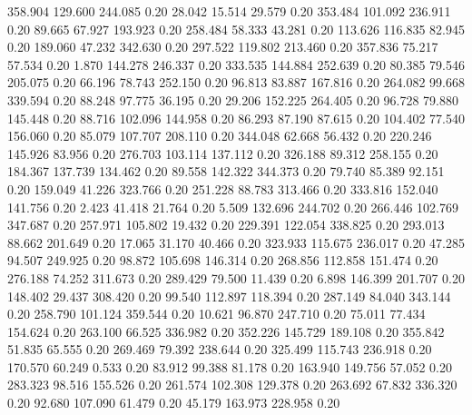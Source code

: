  358.904  129.600  244.085         0.20
  28.042   15.514   29.579         0.20
 353.484  101.092  236.911         0.20
  89.665   67.927  193.923         0.20
 258.484   58.333   43.281         0.20
 113.626  116.835   82.945         0.20
 189.060   47.232  342.630         0.20
 297.522  119.802  213.460         0.20
 357.836   75.217   57.534         0.20
   1.870  144.278  246.337         0.20
 333.535  144.884  252.639         0.20
  80.385   79.546  205.075         0.20
  66.196   78.743  252.150         0.20
  96.813   83.887  167.816         0.20
 264.082   99.668  339.594         0.20
  88.248   97.775   36.195         0.20
  29.206  152.225  264.405         0.20
  96.728   79.880  145.448         0.20
  88.716  102.096  144.958         0.20
  86.293   87.190   87.615         0.20
 104.402   77.540  156.060         0.20
  85.079  107.707  208.110         0.20
 344.048   62.668   56.432         0.20
 220.246  145.926   83.956         0.20
 276.703  103.114  137.112         0.20
 326.188   89.312  258.155         0.20
 184.367  137.739  134.462         0.20
  89.558  142.322  344.373         0.20
  79.740   85.389   92.151         0.20
 159.049   41.226  323.766         0.20
 251.228   88.783  313.466         0.20
 333.816  152.040  141.756         0.20
   2.423   41.418   21.764         0.20
   5.509  132.696  244.702         0.20
 266.446  102.769  347.687         0.20
 257.971  105.802   19.432         0.20
 229.391  122.054  338.825         0.20
 293.013   88.662  201.649         0.20
  17.065   31.170   40.466         0.20
 323.933  115.675  236.017         0.20
  47.285   94.507  249.925         0.20
  98.872  105.698  146.314         0.20
 268.856  112.858  151.474         0.20
 276.188   74.252  311.673         0.20
 289.429   79.500   11.439         0.20
   6.898  146.399  201.707         0.20
 148.402   29.437  308.420         0.20
  99.540  112.897  118.394         0.20
 287.149   84.040  343.144         0.20
 258.790  101.124  359.544         0.20
  10.621   96.870  247.710         0.20
  75.011   77.434  154.624         0.20
 263.100   66.525  336.982         0.20
 352.226  145.729  189.108         0.20
 355.842   51.835   65.555         0.20
 269.469   79.392  238.644         0.20
 325.499  115.743  236.918         0.20
 170.570   60.249    0.533         0.20
  83.912   99.388   81.178         0.20
 163.940  149.756   57.052         0.20
 283.323   98.516  155.526         0.20
 261.574  102.308  129.378         0.20
 263.692   67.832  336.320         0.20
  92.680  107.090   61.479         0.20
  45.179  163.973  228.958         0.20
